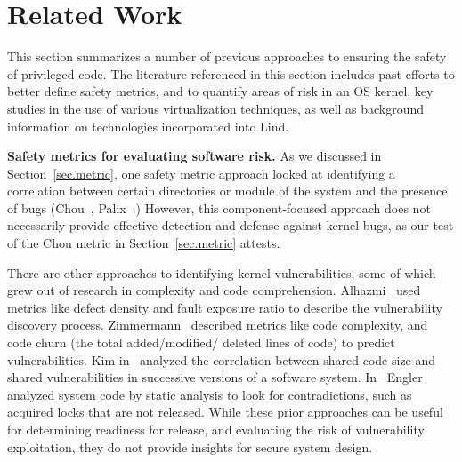 \section{Related Work}
\label{sec.related_work}

This section summarizes a number of previous approaches to ensuring the safety of
 privileged code. %
The literature referenced in this section includes past efforts to better define safety metrics,
and to quantify areas of risk in an OS kernel, key studies in the use of various virtualization
techniques, as well as background information on technologies incorporated into Lind.

\textbf{Safety metrics for evaluating software risk.}
As we discussed in Section~\ref{sec.metric}, one safety metric
approach looked at identifying a correlation between
certain directories or module of the system and the presence of bugs (Chou~\cite{PittSFIeld},
Palix~\cite{palix2011faults}.)
However, this component-focused approach does not necessarily
provide effective detection and defense against kernel bugs, as our test of the
Chou metric in Section~\ref{sec.metric} attests.

 

There are other approaches to identifying kernel vulnerabilities, some of
which grew out of research in complexity and code comprehension.
Alhazmi~\cite{alhazmi2008application}
used metrics like defect density and fault exposure ratio to describe the
vulnerability discovery process. Zimmermann~\cite{zimmermann2010searching}
described metrics like code complexity, and code churn (the total added/modified/
deleted lines of code) to predict vulnerabilities. Kim in~\cite{kim2007vulnerability} analyzed
the correlation between shared code size and shared vulnerabilities in
successive versions of a software system. In~\cite{engler2001bugs} Engler analyzed
system code by static analysis to look for contradictions, such as acquired locks that are
not released. While
these prior approaches can be useful for determining readiness for release, and
evaluating the risk of vulnerability exploitation,
they do not provide insights for secure system design.

